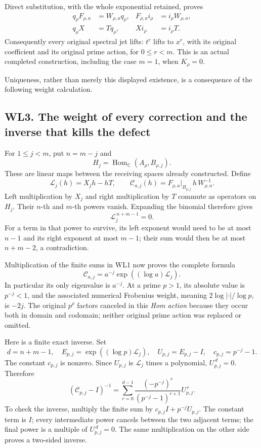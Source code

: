 Direct substitution, with the whole exponential retained, proves \[
 \begin{aligned}
 q_\rho F_{\rho,a}&=W_{\rho,a}q_\rho,&
 F_{\rho,a}i_\rho&=i_\rho W_{\rho,a},\\
 q_\rho X&=Tq_\rho,&Xi_\rho&=i_\rho T.
 \end{aligned}
\tag{WL2.3}
\] Consequently every original spectral jet lifts: \(t^r\) lifts to
\(x^r\), with its original coefficient and its original prime action,
for \(0\leq r<m\). This is an actual completed construction, including
the case \(m=1\), when \(K_\rho=0\).

Uniqueness, rather than merely this displayed existence, is a
consequence of the following weight calculation.

\subsection{WL3. The weight of every correction and the inverse that
kills the
defect}\label{wl3.-the-weight-of-every-correction-and-the-inverse-that-kills-the-defect}

For \(1\leq j<m\), put \(n=m-j\) and \[
 H_j=\operatorname{Hom}_{\mathbb C}(A_\rho,B_{\rho,j}).
\] These are linear maps between the receiving spaces already
constructed. Define \[
 \mathscr L_j(h)=X_jh-hT,\qquad
 \mathscr C_{a,j}(h)=F_{\rho,a}|_{B_{\rho,j}}\,h\,W_{\rho,a}^{-1}.
\tag{WL3.1}
\] Left multiplication by \(X_j\) and right multiplication by \(T\)
commute as operators on \(H_j\). Their \(n\)-th and \(m\)-th powers
vanish. Expanding the binomial therefore gives \[
 \mathscr L_j^{\,n+m-1}=0.
\tag{WL3.2}
\] For a term in that power to survive, its left exponent would need to
be at most \(n-1\) and its right exponent at most \(m-1\); their sum
would then be at most \(n+m-2\), a contradiction.

Multiplication of the finite sums in WL1 now proves the complete formula
\[
 \mathscr C_{a,j}
 =a^{-j}\exp((\log a)\mathscr L_j).
\tag{WL3.3}
\] In particular its only eigenvalue is \(a^{-j}\). At a prime \(p>1\),
its absolute value is \(p^{-j}<1\), and the associated numerical
Frobenius weight, meaning \(2\log|\cdot|/\log p\), is \(-2j\). The
original \(p^\rho\) factors canceled in this \emph{Hom action} because
they occur both in domain and codomain; neither original prime action
was replaced or omitted.

Here is a finite exact inverse. Set \[
 d=n+m-1,\quad E_{p,j}=\exp((\log p)\mathscr L_j),\quad
 U_{p,j}=E_{p,j}-I,\quad c_{p,j}=p^{-j}-1.
\] The constant \(c_{p,j}\) is nonzero. Since \(U_{p,j}\) is
\(\mathscr L_j\) times a polynomial, \(U_{p,j}^{\,d}=0\). Therefore \[
 \boxed{
 (\mathscr C_{p,j}-I)^{-1}
 =
 \sum_{r=0}^{d-1}
 \frac{(-p^{-j})^r}{(p^{-j}-1)^{r+1}}U_{p,j}^{\,r}.
 }
\tag{WL3.4}
\] To check the inverse, multiply the finite sum by
\(c_{p,j}I+p^{-j}U_{p,j}\). The constant term is \(I\); every
intermediate power cancels between the two adjacent terms; the final
power is a multiple of \(U_{p,j}^{\,d}=0\). The same multiplication on
the other side proves a two-sided inverse.

